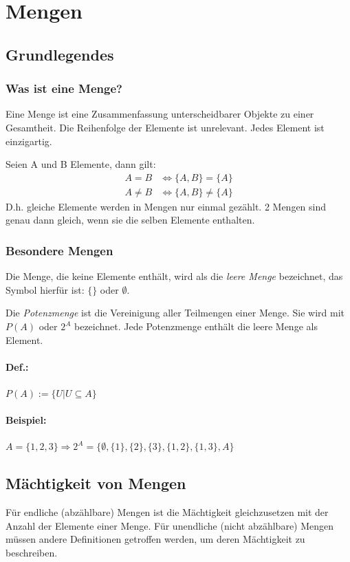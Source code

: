 \documentclass[a4paper,12pt, DIV12]{scrartcl}
\begin{document}
\section{Mengen}
\subsection{Grundlegendes}
\subsubsection*{Was ist eine Menge?}
Eine Menge ist eine Zusammenfassung unterscheidbarer Objekte zu einer
Gesamtheit. Die Reihenfolge der Elemente ist unrelevant. Jedes Element ist einzigartig.

Seien A und B Elemente, dann gilt:
\begin{align}
  A = B    &\Leftrightarrow \{A, B\} = \{A\} \\
  A \neq B &\Leftrightarrow \{A, B\} \neq \{A\}
\end{align}
D.h. gleiche Elemente werden in Mengen nur einmal gezählt.
2 Mengen sind genau dann gleich, wenn sie die selben Elemente
enthalten.
\subsubsection*{Besondere Mengen}
Die Menge, die keine Elemente enthält, wird als die \emph{leere Menge} bezeichnet, das Symbol hierfür ist: $\{\}$ oder ${}\emptyset$.

Die \emph{Potenzmenge} ist die Vereinigung aller Teilmengen einer Menge.
Sie wird mit \(P(A)\) oder \(2^A\) bezeichnet. Jede Potenzmenge
enthält die leere Menge als Element.
\paragraph{Def.:} $P(A):= \{ U| {U}\subseteq{A} \}$
\paragraph{Beispiel:}
\begin{math}
{A = \{1,2,3\} }
\Rightarrow{2^A = \{ \emptyset, \{1\},\{2\},\{3\},\{1,2\},\{1,3\},A \} }
\end{math}
\newpage
\subsection{Mächtigkeit von Mengen}
Für endliche (abzählbare) Mengen ist die Mächtigkeit gleichzusetzen mit der Anzahl
der Elemente einer Menge. Für unendliche (nicht abzählbare) Mengen müssen andere
Definitionen getroffen werden, um deren Mächtigkeit zu beschreiben.
\end{document}
